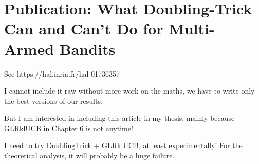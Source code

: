 \chapter{Publication: What Doubling-Trick Can and Can't Do for Multi-Armed Bandits}
\label{app:2:DoublingTricks}

See https://hal.inria.fr/hal-01736357

I cannot include it raw without more work on the maths, we have to write only the best versions of our results.

But I am interested in including this article in my thesis, mainly because GLRklUCB in Chapter 6 is not anytime!

I need to try DoublingTrick + GLRklUCB, at least experimentally!
For the theoretical analysis, it will probably be a huge failure.
